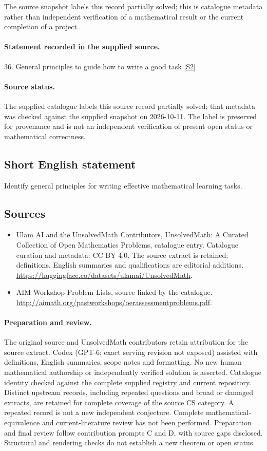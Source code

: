\documentclass[11pt]{article}
\begin{document}
The source snapshot labels this record partially solved; this is catalogue metadata rather than independent verification of a mathematical result or the current completion of a project.
\paragraph{Statement recorded in the supplied source.}
36. General principles to guide how to write a good task \href{http://aimath.org/pastworkshops/oerassessmentproblems.pdf}{[S2]}
\paragraph{Source status.}
The supplied catalogue labels this source record partially solved; that metadata was checked against the supplied snapshot on 2026-10-11. The label is preserved for provenance and is not an independent verification of present open status or mathematical correctness.
\subsection{Short English statement}
Identify general principles for writing effective mathematical learning tasks.
\subsection{Sources}
\begin{itemize}
\item[S1] Ulam AI and the UnsolvedMath Contributors, UnsolvedMath: A Curated Collection of Open Mathematics Problems, catalogue entry. Catalogue curation and metadata: CC BY 4.0. The source extract is retained; definitions, English summaries and qualifications are editorial additions.
\url{https://huggingface.co/datasets/ulamai/UnsolvedMath}.
\item[S2] AIM Workshop Problem Lists, source linked by the catalogue.
\url{http://aimath.org/pastworkshops/oerassessmentproblems.pdf}.
\end{itemize}
\paragraph{Preparation and review.}
The original source and UnsolvedMath contributors retain attribution for the source extract. Codex (GPT-6; exact serving revision not exposed) assisted with definitions, English summaries, scope notes and formatting. No new human mathematical authorship or independently verified solution is asserted. Catalogue identity checked against the complete supplied registry and current repository. Distinct upstream records, including repeated questions and broad or damaged extracts, are retained for complete coverage of the source CS category. A repeated record is not a new independent conjecture. Complete mathematical-equivalence and current-literature review has not been performed. Preparation and final review follow contribution prompts C and D, with source gaps disclosed. Structural and rendering checks do not establish a new theorem or open status.
\label{end:statement}
\end{document}
